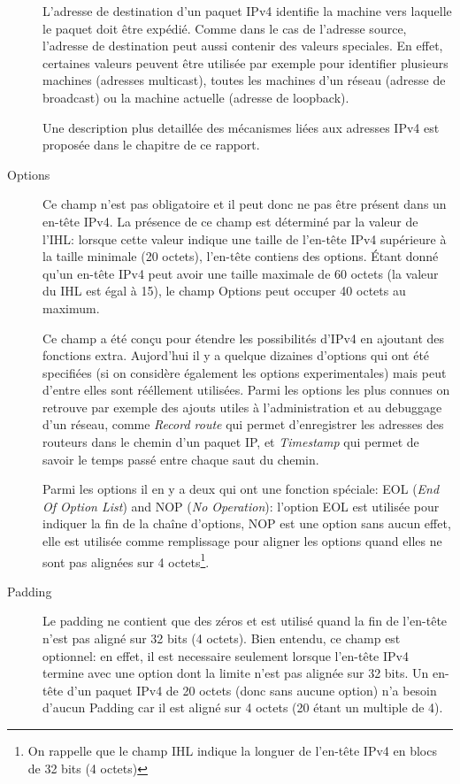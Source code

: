 \begin{description}
L'adresse de destination d'un paquet IPv4 identifie la machine vers
laquelle le paquet doit être expédié. Comme dans le cas de l'adresse source,
 l'adresse de destination peut aussi contenir des valeurs speciales. En effet, certaines 
valeurs peuvent être utilisée par exemple pour identifier plusieurs machines
(adresses multicast), toutes les machines d'un réseau (adresse de broadcast) ou
la machine actuelle (adresse de loopback).

Une description plus detaillée des mécanismes liées aux adresses IPv4 est
proposée dans le chapitre  
de ce rapport.


\item [Options] 
Ce champ n'est pas obligatoire et il peut donc ne pas être présent dans un
en-tête IPv4. La présence de ce champ est déterminé par la valeur de
l'IHL: lorsque cette valeur indique une taille de l'en-tête IPv4 supérieure à 
la taille minimale (20 octets), l'en-tête contiens des options.
Étant donné qu'un en-tête IPv4 peut avoir une taille maximale de 
60 octets (la valeur du IHL est égal à 15), le champ Options peut occuper
40 octets au maximum.

Ce champ a été conçu pour étendre les possibilités d'IPv4 en ajoutant des fonctions
extra.  Aujord'hui il y a quelque dizaines d'options qui ont été
specifiées\cite{url-optsIPv4} (si on considère également les options experimentales)
mais peut d'entre elles sont rééllement utilisées. Parmi les options les plus connues
on retrouve par exemple des ajouts utiles à l'administration et au debuggage
d'un réseau, comme {\it Record route} qui permet d'enregistrer les adresses
des routeurs dans le chemin d'un paquet IP, et {\it Timestamp} qui permet de
savoir le temps passé entre chaque saut du chemin.

Parmi les options il en y a deux qui ont une fonction spéciale: EOL 
({\it End Of Option List}) and NOP ({\it No Operation}): l'option EOL 
est utilisée pour indiquer la fin de la chaîne d'options, NOP est une option
sans aucun effet, elle est utilisée comme remplissage pour aligner les options 
quand elles ne sont pas alignées sur 4 octets\footnote {On rappelle que 
le champ IHL indique la longuer de l'en-tête IPv4 en blocs de 32 bits 
(4 octets)}.



\item [Padding] 
Le padding ne contient que des zéros et est utilisé quand la fin de l'en-tête
n'est pas aligné sur 32 bits (4 octets). Bien entendu, ce champ est optionnel:
en effet, il est necessaire seulement lorsque l'en-tête IPv4 termine avec
une option dont la limite n'est pas alignée sur 32 bits. Un en-tête d'un paquet IPv4 
de 20 octets (donc sans aucune option) n'a besoin d'aucun Padding car il est aligné sur
4 octets (20 étant un multiple de 4).
\end{description}
